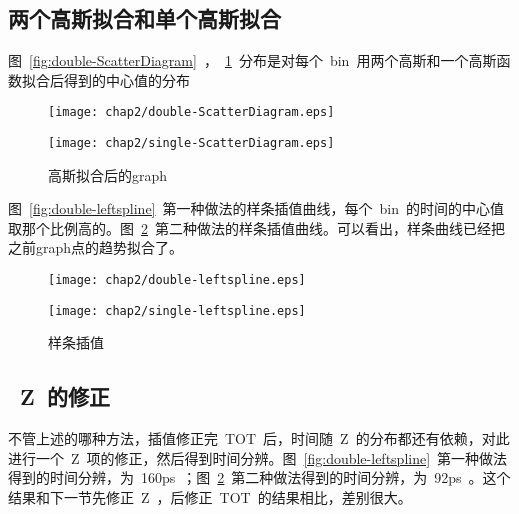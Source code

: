 \subsection{两个高斯拟合和单个高斯拟合}

图~\ref{fig:double-ScatterDiagram}~，~\ref{fig:single-ScatterDiagram}~分布是对每个~bin~用两个高斯和一个高斯函数拟合后得到的中心值的分布

\begin{figure}[!h]
\begin{minipage}[!h]{0.5\linewidth}
\texttt{[image: chap2/double-ScatterDiagram.eps]}
\label{fig:double-ScatterDiagram}
\end{minipage}%
\hfill
\begin{minipage}[!h]{0.5\linewidth}
\texttt{[image: chap2/single-ScatterDiagram.eps]}
\label{fig:single-ScatterDiagram}
\end{minipage}
\caption{高斯拟合后的graph}
\end{figure}

图~\ref{fig:double-leftspline}~第一种做法的样条插值曲线，每个~bin~的时间的中心值取那个比例高的。图~\ref{fig:single-leftspline}~第二种做法的样条插值曲线。可以看出，样条曲线已经把之前graph点的趋势拟合了。

\begin{figure}[!h]
\begin{minipage}[!h]{0.5\linewidth}
\texttt{[image: chap2/double-leftspline.eps]}
\label{fig:double-leftspline}
\end{minipage}%
\hfill
\begin{minipage}[!h]{0.5\linewidth}
\texttt{[image: chap2/single-leftspline.eps]}
\label{fig:single-leftspline}
\end{minipage}
\caption{样条插值}
\end{figure}

\subsection{~Z~的修正}
不管上述的哪种方法，插值修正完~TOT~后，时间随~Z~的分布都还有依赖，对此进行一个~Z~项的修正，然后得到时间分辨。图~\ref{fig:double-leftspline}~第一种做法得到的时间分辨，为~160ps~；图~\ref{fig:single-leftspline}~第二种做法得到的时间分辨，为~92ps~。这个结果和下一节先修正~Z~，后修正~TOT~的结果相比，差别很大。

